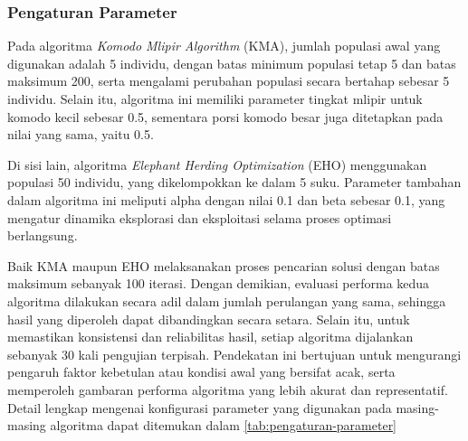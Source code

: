 \subsubsection{Pengaturan Parameter}
Pada algoritma \textit{Komodo Mlipir Algorithm} (KMA), jumlah populasi awal yang digunakan adalah 5 individu, dengan batas minimum populasi tetap 5 dan batas maksimum 200, serta mengalami perubahan populasi secara bertahap sebesar 5 individu. Selain itu, algoritma ini memiliki parameter tingkat mlipir untuk komodo kecil sebesar 0.5, sementara porsi komodo besar juga ditetapkan pada nilai yang sama, yaitu 0.5.

Di sisi lain, algoritma \textit{Elephant Herding Optimization} (EHO) menggunakan populasi 50 individu, yang dikelompokkan ke dalam 5 suku. Parameter tambahan dalam algoritma ini meliputi alpha dengan nilai 0.1 dan beta sebesar 0.1, yang mengatur dinamika eksplorasi dan eksploitasi selama proses optimasi berlangsung.

Baik KMA maupun EHO melaksanakan proses pencarian solusi dengan batas maksimum sebanyak 100 iterasi. Dengan demikian, evaluasi performa kedua algoritma dilakukan secara adil dalam jumlah perulangan yang sama, sehingga hasil yang diperoleh dapat dibandingkan secara setara. Selain itu, untuk memastikan konsistensi dan reliabilitas hasil, setiap algoritma dijalankan sebanyak 30 kali pengujian terpisah. Pendekatan ini bertujuan untuk mengurangi pengaruh faktor kebetulan atau kondisi awal yang bersifat acak, serta memperoleh gambaran performa algoritma yang lebih akurat dan representatif. Detail lengkap mengenai konfigurasi parameter yang digunakan pada masing-masing algoritma dapat ditemukan dalam \cref{tab:pengaturan-parameter}

